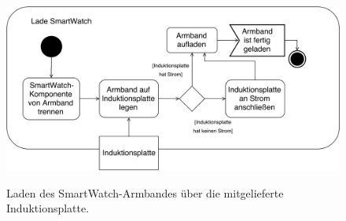 \begin{figure}[h]
\centering\
\includegraphics[width=\textwidth]{img/activityLaden}
\caption{Laden des SmartWatch-Armbandes über die mitgelieferte Induktionsplatte.}\label{fig:activityLaden}
\end{figure}
